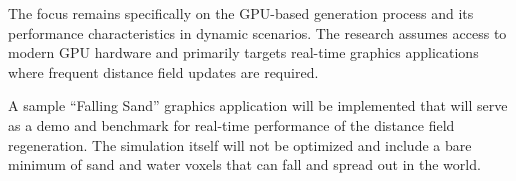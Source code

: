 The focus remains specifically on the GPU-based generation process and its performance characteristics in dynamic
scenarios. The research assumes access to modern GPU hardware and primarily targets real-time graphics applications
where frequent distance field updates are required.

A sample ``Falling Sand'' graphics application will be implemented that will serve as a demo and benchmark for real-time
performance of the distance field regeneration. The simulation itself will not be optimized and include a bare minimum
of sand and water voxels that can fall and spread out in the world.